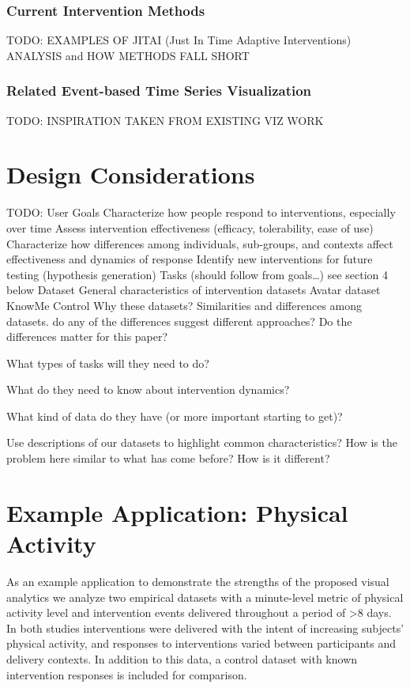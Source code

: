 \documentclass[review,journal]{vgtc}         %
\begin{document}
\subsubsection{Current Intervention Methods}
TODO: EXAMPLES OF JITAI (Just In Time Adaptive Interventions) ANALYSIS and HOW METHODS FALL SHORT

\subsubsection{Related Event-based Time Series Visualization}
TODO: INSPIRATION TAKEN FROM EXISTING VIZ WORK


\section{Design Considerations}
TODO:
User Goals
Characterize how people respond to interventions, especially over time
Assess intervention effectiveness (efficacy, tolerability, ease of use)
Characterize how differences among individuals, sub-groups, and contexts affect effectiveness and dynamics of response
Identify new interventions for future testing (hypothesis generation)
Tasks (should follow from goals…)
see section 4 below
Dataset
General characteristics of intervention datasets
Avatar dataset
KnowMe
Control
Why these datasets?
Similarities and differences among datasets.
do any of the differences suggest different approaches?  Do the differences matter for this paper?

What types of tasks will they need to do?

What do they need to know about intervention dynamics?

What kind of data do they have (or more important starting to get)?  

Use descriptions of our datasets to highlight common characteristics?
How is the problem here similar to what has come before?  How is it different?  



\section{Example Application: Physical Activity}
As an example application to demonstrate the strengths of the proposed visual analytics we analyze two empirical datasets with a minute-level metric of physical activity level and intervention events delivered throughout a period of >8 days.
In both studies interventions were delivered with the intent of increasing subjects’ physical activity, and responses to interventions varied between participants and delivery contexts.
In addition to this data, a control dataset with known intervention responses is included for comparison.
\end{document}
